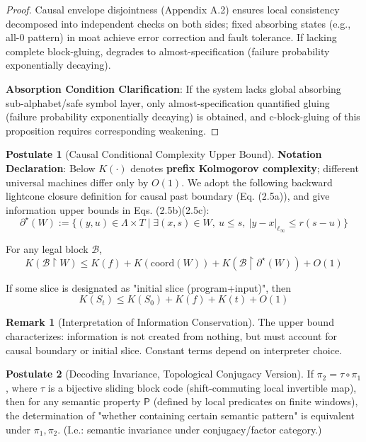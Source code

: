 \documentclass[12pt]{article}
\theoremstyle{plain}
\theoremstyle{definition}
\newtheorem{remark}[theorem]{Remark}
\newtheorem{postulate}{Postulate}
\begin{document}
\begin{proof}
Causal envelope disjointness (Appendix A.2) ensures local consistency decomposed into independent checks on both sides; fixed absorbing states (e.g., all-0 pattern) in moat achieve error correction and fault tolerance. If lacking complete block-gluing, degrades to almost-specification (failure probability exponentially decaying).

\textbf{Absorption Condition Clarification}: If the system lacks global absorbing sub-alphabet/safe symbol layer, only almost-specification quantified gluing (failure probability exponentially decaying) is obtained, and c-block-gluing of this proposition requires corresponding weakening.
\end{proof}

\begin{postulate}[Causal Conditional Complexity Upper Bound]
\textbf{Notation Declaration}: Below $K(\cdot)$ denotes \textbf{prefix Kolmogorov complexity}; different universal machines differ only by $O(1)$. We adopt the following backward lightcone closure definition for causal past boundary (Eq. (2.5a)), and give information upper bounds in Eqs. (2.5b)(2.5c):
\[
\partial^\star(W) := \bigl\{ (y,u) \in \Lambda \times T \mid \exists (x,s) \in W,\ u \le s,\ |y-x|_{\ell_\infty} \le r(s-u) \bigr\} \tag{2.5a}
\]

For any legal block $\mathcal{B}$,
\[
K(\mathcal{B} \upharpoonright W) \le K(f) + K(\mathrm{coord}(W)) + K(\mathcal{B} \upharpoonright \partial^\star(W)) + O(1) \tag{2.5b}
\]

If some slice is designated as "initial slice (program+input)", then
\[
K(S_t) \le K(S_0) + K(f) + K(t) + O(1) \tag{2.5c}
\]
\end{postulate}

\begin{remark}[Interpretation of Information Conservation]
The upper bound characterizes: information is not created from nothing, but must account for causal boundary or initial slice. Constant terms depend on interpreter choice.
\end{remark}

\begin{postulate}[Decoding Invariance, Topological Conjugacy Version]
If $\pi_2 = \tau \circ \pi_1$, where $\tau$ is a bijective sliding block code (shift-commuting local invertible map), then for any semantic property $\mathsf{P}$ (defined by local predicates on finite windows), the determination of "whether containing certain semantic pattern" is equivalent under $\pi_1, \pi_2$. (I.e.: semantic invariance under conjugacy/factor category.)
\end{postulate}
\end{document}
